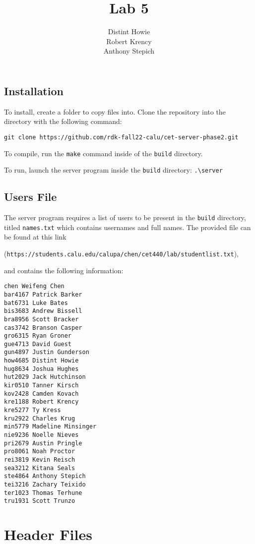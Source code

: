\documentclass{article}
\date{}
\author{Distint Howie \\ Robert Krency \\ Anthony Stepich}
\title{Lab 5}
\newcommand{\code}[1]{\colorbox{codegray}{\texttt{#1}}}
\begin{document}
\maketitle

\pagebreak

\subsection*{Installation}

To install, create a folder to copy files into. Clone the repository into the directory with the following command: 

\code{git clone https://github.com/rdk-fall22-calu/cet-server-phase2.git}

To compile, run the \code{make} command inside of the \code{build} directory.

To run, launch the server program inside the \code{build} directory: \code{.{\textbackslash}server}

\subsection*{Users File}

The server program requires a list of users to be present in the \code{build} directory, titled \code{names.txt} which contains usernames and full names.
The provided file can be found at this link 

(\code{https://students.calu.edu/calupa/chen/cet440/lab/studentlist.txt}), 

and contains the following information:

\begin{lstlisting}[style=CStyle]
chen Weifeng Chen
bar4167 Patrick Barker
bat6731 Luke Bates
bis3683 Andrew Bissell
bra8956 Scott Bracker
cas3742 Branson Casper
gro6315 Ryan Groner
gue4713 David Guest
gun4897 Justin Gunderson
how4685 Distint Howie
hug8634 Joshua Hughes
hut2029 Jack Hutchinson
kir0510 Tanner Kirsch
kov2428 Camden Kovach
kre1188 Robert Krency
kre5277 Ty Kress
kru2922 Charles Krug
min5779 Madeline Minsinger
nie9236 Noelle Nieves
pri2679 Austin Pringle
pro8061 Noah Proctor
rei3819 Kevin Reisch
sea3212 Kitana Seals
ste4864 Anthony Stepich
tei3216 Zachary Teixido
ter1023 Thomas Terhune
tru1931 Scott Trunzo
\end{lstlisting}



\pagebreak
\section*{Header Files}
\end{document}
